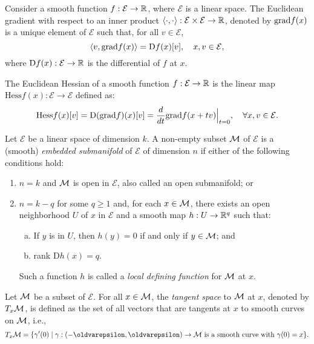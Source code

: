\begin{definition}
    Consider a smooth function $f: \mathcal{E} \to \mathbb{R}$, where $\mathcal{E}$ is a linear space. The Euclidean gradient with respect to an inner product $\langle \cdot, \cdot \rangle: \mathcal{E} \times \mathcal{E} \to \mathbb{R}$, denoted by $\mathrm{grad }{f}(x)$ is a unique element of $\mathcal{E}$ such that, for all $v \in \mathcal{E}$, 
    \[
        \langle v, \mathrm{grad }{f}(x) \rangle = \textrm{D}f(x)[v],\quad x,v \in \mathcal{E},
    \]
    where $\textrm{D}f(x) : \mathcal{E} \to \mathbb{R}$ is the differential of $f$ at $x$.
\end{definition}

\begin{definition}
    The Euclidean Hessian of a smooth function $f: \mathcal{E} \to \mathbb{R}$ is the linear map $\textrm{Hess}f(x) : \mathcal{E} \to \mathcal{E}$ defined as:
    \[
        \textrm{Hess}f(x)[v] = \textrm{D}(\grad{f})(x)[v] = \frac{d}{dt} \grad{f}(x + tv) \Big|_{t = 0}, \quad \forall x,v \in \mathcal{E}.
    \]
\end{definition}

\begin{definition}
    Let $\mathcal{E}$ be a linear space of dimension $k$. A non-empty subset $\mathcal{M}$ of $\mathcal{E}$ is a (smooth) \emph{embedded submanifold} of $\mathcal{E}$ of dimension $n$ if either of the following conditions hold:
    \begin{enumerate}
        \item $n=k$ and $\mathcal{M}$ is open in $\mathcal{E}$, also called an open submanifold; or 
        \item $n=k-q$ for some $q \geq 1$ and, for each $x \in \mathcal{M}$, there exists an open neighborhood $U$ of $x$ in $\mathcal{E}$ and a smooth map $h : U \to \mathbb{R}^q$ such that:
        \begin{enumerate}[(a)]
            \item If $y$ is in $U$, then $h(y) = 0$ if and only if $y \in \mathcal{M}$; and
            \item \textrm{rank} $\textrm{D}h(x) = q$.
        \end{enumerate}
        Such a function $h$ is called a \emph{local defining function} for $\mathcal{M}$ at $x$.
    \end{enumerate}
    
\end{definition}

\begin{definition}
   Let $\mathcal{M}$ be a subset of $\mathcal{E}$. For all $x \in \mathcal{M}$, the \emph{tangent space} to $\mathcal{M}$ at $x$, denoted by $T_x \mathcal{M}$, is defined as the set of all vectors that are tangents at $x$ to smooth curves on $\mathcal{M}$, i.e.,
   \[
        T_x \M = \{ \gamma'(0) \mid \gamma : (-\epsilon, \epsilon) \to \M \textrm{ is a smooth curve with } \gamma(0) = x \}.
   \]
\end{definition}

